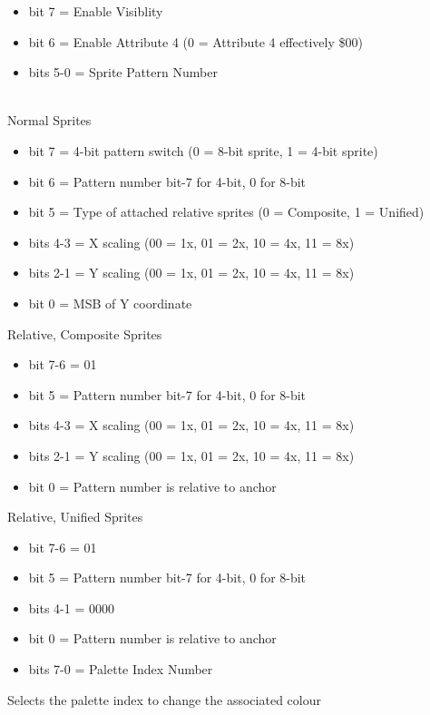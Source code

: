\begin{itemize}
\item bit 7 = Enable Visiblity
\item bit 6 = Enable Attribute 4 (0 = Attribute 4 effectively \$00)
\item bits 5-0 = Sprite Pattern Number
\end{itemize}

\\
Normal Sprites
\begin{itemize}
\item bit 7 = 4-bit pattern switch (0 = 8-bit sprite, 1 = 4-bit sprite)
\item bit 6 = Pattern number bit-7 for 4-bit, 0 for 8-bit
\item bit 5 = Type of attached relative sprites (0 = Composite, 1 =
  Unified)
\item bits 4-3 = X scaling (00 = 1x, 01 = 2x, 10 = 4x, 11 = 8x)
\item bits 2-1 = Y scaling (00 = 1x, 01 = 2x, 10 = 4x, 11 = 8x)
\item bit 0 = MSB of Y coordinate
\end{itemize}
Relative, Composite Sprites
\begin{itemize}
\item bit 7-6 = 01
\item bit 5 = Pattern number bit-7 for 4-bit, 0 for 8-bit
\item bits 4-3 = X scaling (00 = 1x, 01 = 2x, 10 = 4x, 11 = 8x)
\item bits 2-1 = Y scaling (00 = 1x, 01 = 2x, 10 = 4x, 11 = 8x)
\item bit 0 = Pattern number is relative to anchor
\end{itemize}
Relative, Unified Sprites
\begin{itemize}
\item bit 7-6 = 01
\item bit 5 = Pattern number bit-7 for 4-bit, 0 for 8-bit
\item bits 4-1 = 0000
\item bit 0 = Pattern number is relative to anchor
\end{itemize}

\begin{itemize}
\item bits 7-0 = Palette Index Number
\end{itemize}
Selects the palette index to change the associated colour

